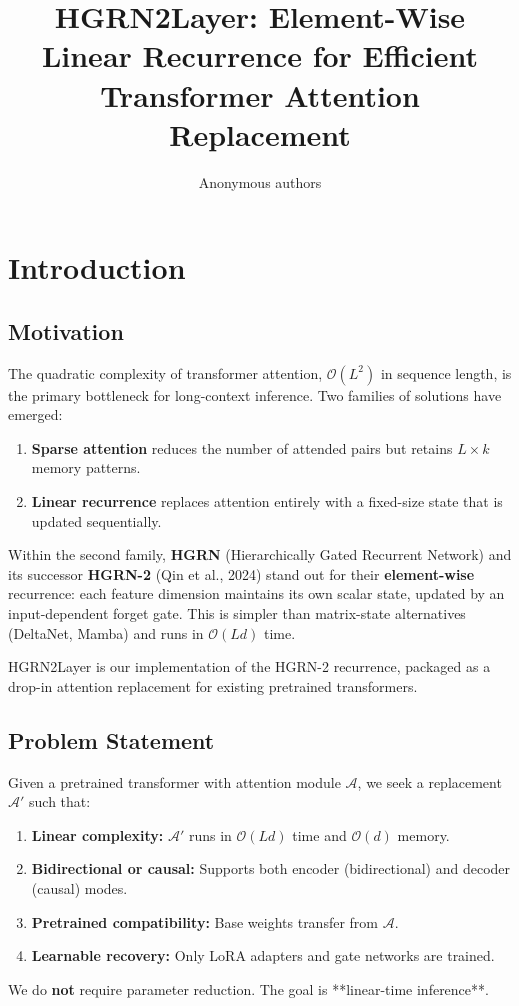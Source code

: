 \title{\textbf{HGRN2Layer: Element-Wise Linear Recurrence for Efficient Transformer Attention Replacement}}

\author{Anonymous authors}


\section{Introduction}

\subsection{Motivation}

The quadratic complexity of transformer attention, $\mathcal{O}(L^2)$ in 
sequence length, is the primary bottleneck for long-context inference. Two 
families of solutions have emerged:

\begin{enumerate}
\item \textbf{Sparse attention} reduces the number of attended pairs but retains
  $L \times k$ memory patterns.
\item \textbf{Linear recurrence} replaces attention entirely with a fixed-size state
  that is updated sequentially.

\end{enumerate}
Within the second family, \textbf{HGRN} (Hierarchically Gated Recurrent Network) 
and its successor \textbf{HGRN-2} (Qin et al., 2024) stand out for their 
\textbf{element-wise} recurrence: each feature dimension maintains its own scalar 
state, updated by an input-dependent forget gate. This is simpler than 
matrix-state alternatives (DeltaNet, Mamba) and runs in $\mathcal{O}(L d)$ 
time.

HGRN2Layer is our implementation of the HGRN-2 recurrence, packaged as a 
drop-in attention replacement for existing pretrained transformers.

\subsection{Problem Statement}

Given a pretrained transformer with attention module $\mathcal{A}$, we seek 
a replacement $\mathcal{A}'$ such that:

\begin{enumerate}
\item \textbf{Linear complexity:} $\mathcal{A}'$ runs in $\mathcal{O}(L d)$ time and
  $\mathcal{O}(d)$ memory.
\item \textbf{Bidirectional or causal:} Supports both encoder (bidirectional) and
  decoder (causal) modes.
\item \textbf{Pretrained compatibility:} Base weights transfer from $\mathcal{A}$.
\item \textbf{Learnable recovery:} Only LoRA adapters and gate networks are trained.

\end{enumerate}
We do \textbf{not} require parameter reduction. The goal is **linear-time 
inference**.

